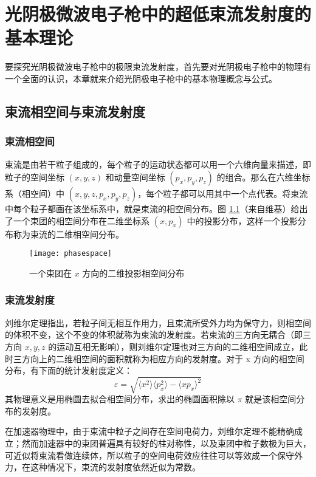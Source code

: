 \chapter{光阴极微波电子枪中的超低束流发射度的基本理论}
\label{chap:theory}

要探究光阴极微波电子枪中的极限束流发射度，首先要对光阴极电子枪中的物理有一个全面的认识，本章就来介绍光阴极电子枪中的基本物理概念与公式。

\section{束流相空间与束流发射度}
\subsection{束流相空间}
束流是由若干粒子组成的，每个粒子的运动状态都可以用一个六维向量来描述，即粒子的空间坐标 $(x, y, z)$ 和动量空间坐标 $(p_x, p_y, p_z)$ 的组合。那么在六维坐标系（相空间）中 $(x, y, z, p_x, p_y, p_z)$，每个粒子都可以用其中一个点代表。将束流中每个粒子都画在该坐标系中，就是束流的相空间分布。图 \ref{fig:phase-space}（来自维基）给出了一个束团的相空间分布在二维坐标系 $(x, p_x)$ 中的投影分布，这样一个投影分布称为束流的二维相空间分布。
\begin{figure}[htbp]
\centering
\texttt{[image: phasespace]}
\caption{\label{fig:phase-space} 一个束团在 $x$ 方向的二维投影相空间分布}
\end{figure}

\subsection{束流发射度}
刘维尔定理指出，若粒子间无相互作用力，且束流所受外力均为保守力，则相空间的体积不变，这个不变的体积就称为束流的发射度。若束流的三方向无耦合（即三方向 $x, y, z$ 的运动互相无影响），则刘维尔定理也对三方向的二维相空间成立，此时三方向上的二维相空间的面积就称为相应方向的发射度。对于 x 方向的相空间分布，有下面的统计发射度定义：
\begin{equation}
\varepsilon = \sqrt{\langle x^2\rangle\langle p_x^2\rangle-\langle xp_x\rangle^2}
\label{eq:stat-emit-1}
\end{equation}
其物理意义是用椭圆去拟合相空间分布，求出的椭圆面积除以 $\pi$ 就是该相空间分布的发射度。

在加速器物理中，由于束流中粒子之间存在空间电荷力，刘维尔定理不能精确成立；然而加速器中的束团普遍具有较好的柱对称性，以及束团中粒子数极为巨大，可近似将束流看做连续体，所以粒子的空间电荷效应往往可以等效成一个保守外力，在这种情况下，束流的发射度依然近似为常数。

